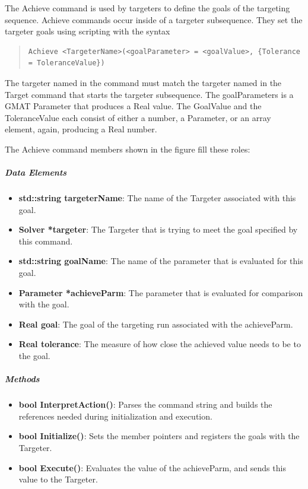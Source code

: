 The Achieve command is used by targeters to define the goals of the targeting sequence.  Achieve
commands occur inside of a targeter subsequence.  They set the targeter goals using scripting with
the syntax

\begin{quote}
\begin{verbatim}
Achieve <TargeterName>(<goalParameter> = <goalValue>, {Tolerance = ToleranceValue})
\end{verbatim}
\end{quote}

\noindent The targeter named in the command must match the targeter named in the Target command that
starts the targeter subsequence.  The goalParameters is a GMAT Parameter that produces a Real
value. The GoalValue and the ToleranceValue each consist of  either a number, a Parameter, or an
array element, again, producing a Real number.

The Achieve command members shown in the figure fill these roles:

\subparagraph{Data Elements}

\begin{itemize}
\item \textbf{std::string targeterName}: The name of the Targeter associated with this goal.
\item \textbf{Solver *targeter}: The Targeter that is trying to meet the goal specified by this
command.
\item \textbf{std::string goalName}: The name of the parameter that is evaluated for this goal.
\item \textbf{Parameter *achieveParm}: The parameter that is evaluated for comparison with the goal.
\item \textbf{Real goal}:  The goal of the targeting run associated with the achieveParm.
\item \textbf{Real tolerance}:  The measure of how close the achieved value needs to be to the goal.
\end{itemize}

\subparagraph{Methods}

\begin{itemize}
\item \textbf{bool InterpretAction()}: Parses the command string and builds the references needed
during initialization and execution.
\item \textbf{bool Initialize()}: Sets the member pointers and registers the goals with the
Targeter.
\item \textbf{bool Execute()}: Evaluates the value of the achieveParm, and sends this value to the
Targeter.
\end{itemize}

